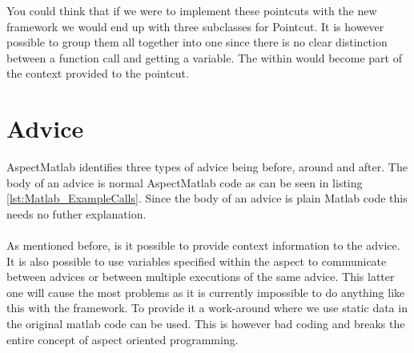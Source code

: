 \documentclass[a4paper]{report}
\begin{document}
You could think that if we were to implement these pointcuts with the new framework we would end up with three subclasses for Pointcut. It is however possible to group them all together into one since there is no clear distinction between a function call and getting a variable. The within would become part of the context provided to the pointcut.

\section{Advice}
AspectMatlab identifies three types of advice being before, around and after. The body of an advice is normal AspectMatlab code as can be seen in listing \ref{lst:Matlab_ExampleCalls}. Since the body of an advice is plain Matlab code this needs no futher explanation.\\
\\
As mentioned before, is it possible to provide context information to the advice. It is also possible to use variables specified within the aspect to communicate between advices or between multiple executions of the same advice. This latter one will cause the most problems as it is currently impossible to do anything like this with the framework. To provide it a work-around where we use static data in the original matlab code can be used. This is however bad coding and breaks the entire concept of aspect oriented programming.
\end{document}
